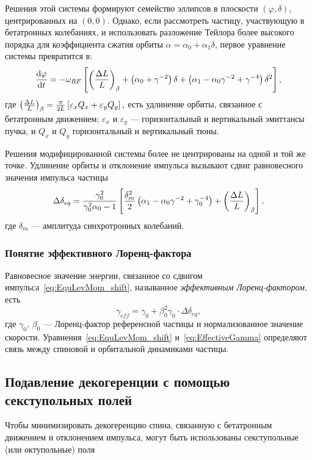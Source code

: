 \documentclass{report}
\begin{document}
Решения этой системы формируют семейство эллипсов в плоскости
$(\varphi, \delta)$, центрированных на $(0,0)$. Однако, если
рассмотреть частицу, участвующую в бетатронных колебаниях, и
использовать разложение Тейлора более высокого порядка для
коэффициента сжатия орбиты $\alpha = \alpha_0 + \alpha_1\delta$,
первое уравнение системы превратится в:~\citep[p.~2579]{Senichev:IPAC13}
\[
\ddt{\varphi} = -\w_{RF} \bkt*{\bkt{\frac{\Delta L}{L}}_\beta + \bkt{\alpha_0 + \gamma^{-2}}\delta + \bkt{\alpha_1 - \alpha_0\gamma^{-2} + \gamma^{-4}}\delta^2},
\]
где $\bkt{\frac{\Delta L}{L}}_\beta =
\frac{\pi}{2L}\bkt*{\varepsilon_xQ_x + \varepsilon_yQ_y},$ есть
удлинение орбиты, связанное с бетатронным движением; $\varepsilon_x$ и
$\varepsilon_y$ --- горизонтальный и вертикальный эмиттансы пучка, и
$Q_x$ и $Q_y$ горизонтальный и вертикальный тюны.~\citep[p.~2580]{Senichev:IPAC13}

Решения модифицированной системы более не центрированы на одной и той
же точке. Удлинение орбиты и отклонение импульса вызывают сдвиг
равновесного значения импульса частицы~\citep[p.~2581]{Senichev:IPAC13}
\begin{equation}\label{eq:EquLevMom_shift}
  \Delta\delta_{eq} = \frac{\gamma_0^2}{\gamma_0^2\alpha_0 - 1}\bkt*{\frac{\delta_m^2}{2}\bkt{\alpha_1 - \alpha_0\gamma^{-2} + \gamma_0^{-4}} + \bkt{\frac{\Delta L}{L}}_\beta},
\end{equation}
где $\delta_m$ --- амплитуда синхротронных колебаний.

\subsubsection{Понятие эффективного Лоренц-фактора}
Равновесное значение энергии, связанное со сдвигом импульса~\eqref{eq:EquLevMom_shift}, называнное \emph{эффективным Лоренц-фактором}, есть~\cite{Senichev:FDM}
\begin{equation}\label{eq:EffectiveGamma}
  \gamma_{eff} = \gamma_0 + \beta_0^2\gamma_0\cdot\Delta\delta_{eq},
\end{equation}
где $\gamma_0$, $\beta_0$ --- Лоренц-фактор референсной частицы и
нормализованное значение
скорости. Уравнения~\eqref{eq:EquLevMom_shift}
и~\eqref{eq:EffectiveGamma} определяют связь между спиновой и
орбитальной динамиками частицы.


\subsection{Подавление декогеренции с помощью секступольных полей}
Чтобы минимизировать декогеренцию спина, связанную с бетатронным
движением и отклонением импульса, могут быть использованы
секступольные (или октупольные) поля~\citep[p.~212]{Eremey:Thesis}
\end{document}
